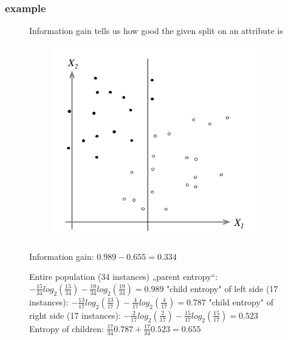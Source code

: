 \documentclass{beamer}
\begin{document}
\begin{frame}
\frametitle{example}
\begin{figure}
\centering
\begin{minipage}{.4\textwidth}
Information gain tells us \newline
how good the given split \newline on an
attribute is
\begin{figure}
  \centering
  \includegraphics[width=1\linewidth]{figures/04/01_classification/example_decision.png}
\end{figure}
Information gain: 
\newline
$0.989 - 0. 655=0.334$


\end{minipage}%
\begin{minipage}{.5\textwidth}
Entire population (34 instances)
„parent entropy“:
\newline
$- \frac{15}{34} log_2 (\frac{15}{34})-\frac{19}{34} log_2 (\frac{19}{34}) = 0.989 $
\newline
\newline
"child entropy" of left side (17 instances):
\newline
$- \frac{13}{17} log_2 (\frac{13}{17})-\frac{4}{17} log_2 (\frac{4}{17}) = 0.787 $
\newline
\newline
"child entropy" of right side (17 instances):
\newline
$- \frac{2}{17} log_2 (\frac{2}{17})-\frac{15}{17} log_2 (\frac{15}{17}) = 0.523$
\newline
\newline
Entropy of children:
\newline
$\frac{17}{34} 0.787 + \frac{17}{34} 0.523 = 0.655$
\end{minipage}
\end{figure}
\end{frame}
\end{document}
